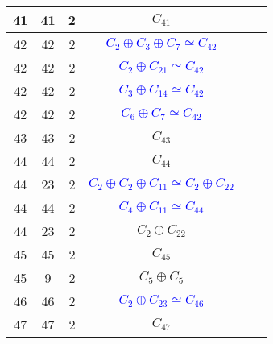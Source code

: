 \documentclass[12pt, openany]{report}
\begin{document}
\begin{tabular}{|c||c|c|c|c|c|}
\hline  41& 41 & 2 & $C_{41}$ \\
\hline  42& 42 & 2 & \textcolor{blue}{$C_{2}\oplus C_{3}\oplus C_{7} \simeq C_{42}$} \\
\hline  42& 42 & 2 & \textcolor{blue}{$C_{2}\oplus C_{21} \simeq C_{42}$} \\
\hline  42& 42 & 2 & \textcolor{blue}{$C_{3}\oplus C_{14} \simeq C_{42}$} \\
\hline  42& 42 & 2 & \textcolor{blue}{$C_{6}\oplus C_{7} \simeq C_{42}$} \\
\hline  43& 43 & 2& $C_{43}$ \\
\hline  44& 44 & 2 & $C_{44}$ \\
\hline  44& 23 & 2 & \textcolor{blue}{$C_{2}\oplus C_{2}\oplus C_{11} \simeq C_{2} \oplus C_{22}$} \\
\hline  44&  44 & 2 & \textcolor{blue}{$C_{4}\oplus C_{11} \simeq C_{44}$} \\
\hline  44&  23 & 2 & $C_{2} \oplus C_{22}$ \\
\hline  45&  45 & 2 & $C_{45}$ \\
\hline  45& 9 & 2 & $ C_{5}\oplus C_{5}$ \\
\hline  46&  46 & 2 &\textcolor{blue}{$C_{2}\oplus C_{23} \simeq C_{46}$}  \\
\hline  47& 47 & 2 & $C_{47}$ \\
\hline                             
\end{tabular}
\end{document}
